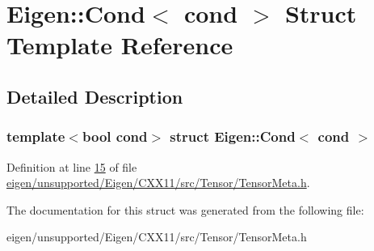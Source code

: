 \hypertarget{struct_eigen_1_1_cond}{}\section{Eigen\+:\+:Cond$<$ cond $>$ Struct Template Reference}
\label{struct_eigen_1_1_cond}


\subsection{Detailed Description}
\subsubsection*{template$<$bool cond$>$\newline
struct Eigen\+::\+Cond$<$ cond $>$}



Definition at line \hyperlink{eigen_2unsupported_2_eigen_2_c_x_x11_2src_2_tensor_2_tensor_meta_8h_source_l00015}{15} of file \hyperlink{eigen_2unsupported_2_eigen_2_c_x_x11_2src_2_tensor_2_tensor_meta_8h_source}{eigen/unsupported/\+Eigen/\+C\+X\+X11/src/\+Tensor/\+Tensor\+Meta.\+h}.



The documentation for this struct was generated from the following file\+:\begin{DoxyCompactItemize}
\item 
eigen/unsupported/\+Eigen/\+C\+X\+X11/src/\+Tensor/\+Tensor\+Meta.\+h\end{DoxyCompactItemize}
